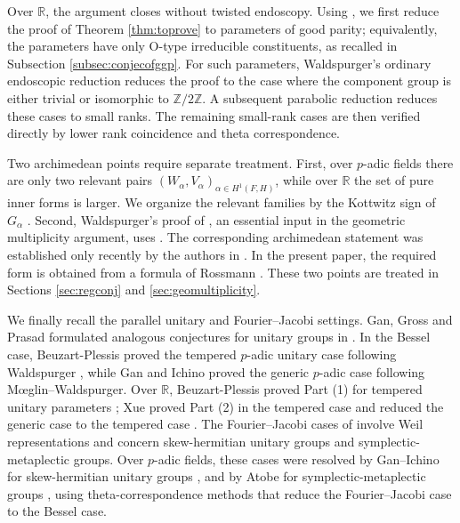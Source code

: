 \documentclass[12pt]{amsart}
\numberwithin{equation}{subsection}
\newcommand{\BR}{{\mathbb {R}}}
\newcommand{\BZ}{{\mathbb {Z}}}
\def\alp{{\alpha}}
\begin{document}
Over $\BR$, the argument closes without twisted endoscopy. Using
\cite[Thm.~4.4]{moeglin2020paquets}\cite[\S 6]{renard2024generic}, we first reduce the proof of Theorem \ref{thm:toprove}
to parameters of good parity; equivalently, the parameters have only
$\mathrm{O}$-type irreducible constituents, as recalled in
Subsection \ref{subsec:conjecofggp}. For such parameters, Waldspurger's
ordinary endoscopic reduction \cite{MR3155345} reduces the proof to the case
where the component group is either trivial or isomorphic to $\BZ/2\BZ$. A
subsequent parabolic reduction reduces these cases to small ranks. The
remaining small-rank cases are then verified directly by lower rank coincidence and theta correspondence.

Two archimedean points require separate treatment. First, over $p$-adic fields
there are only two relevant pairs
$(W_\alp,V_\alp)_{\alp\in H^1(F,H)}$, while over $\BR$ the set of pure inner
forms is larger. We organize the relevant families by the Kottwitz sign of
$G_\alp$ \cite{kottsign}. Second, Waldspurger's proof of
\cite[Lem.~13.4~(ii)]{waldspurger10}, an essential input in the geometric
multiplicity argument, uses \cite[Conj.~1.2]{waldtransfert}. The corresponding
archimedean statement was established only recently by the authors in
\cite{chen2025fourier}. In the present paper, the required form is obtained
from a formula of Rossmann \cite{MR508985}. These two points are treated in
Sections \ref{sec:regconj} and \ref{sec:geomultiplicity}.

We finally recall the parallel unitary and Fourier--Jacobi settings. Gan,
Gross and Prasad formulated analogous conjectures for unitary groups in
\cite{ggporiginal}. In the Bessel case, Beuzart-Plessis proved the tempered
$p$-adic unitary case following Waldspurger
\cite{raphaelpadic,MR3251763}, while Gan and Ichino proved the generic
$p$-adic case \cite{MR3573972} following M\oe glin--Waldspurger.
Over $\BR$, Beuzart-Plessis proved Part (1) for tempered unitary parameters
\cite{beuzart2015local}; Xue proved Part (2) in the tempered case
\cite{xue1bessel} and reduced the generic case to the tempered case
\cite{xue1besselgeneric}. The Fourier--Jacobi cases of \cite{ggporiginal}
involve Weil representations and concern skew-hermitian unitary groups and
symplectic-metaplectic groups. Over $p$-adic fields, these cases were resolved
by Gan--Ichino for skew-hermitian unitary groups \cite{MR3573972}, and by Atobe
for symplectic-metaplectic groups \cite{MR3788848}, using theta-correspondence
methods that reduce the Fourier--Jacobi case to the Bessel case.
\end{document}
